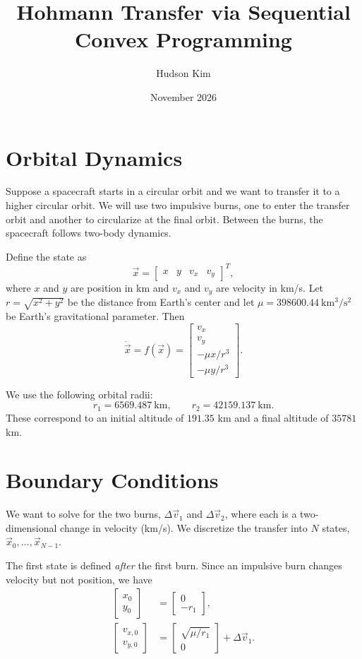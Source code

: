 \documentclass{article}
\title{Hohmann Transfer via Sequential Convex Programming}
\author{Hudson Kim}
\date{November 2026}
\begin{document}
\maketitle

\section{Orbital Dynamics}

Suppose a spacecraft starts in a circular orbit and we want to transfer it to a higher circular orbit. We will use two impulsive burns, one to enter the transfer orbit and another to circularize at the final orbit. Between the burns, the spacecraft follows two-body dynamics.

Define the state as
\[
\vec{x}=\begin{bmatrix}x&y&v_x&v_y\end{bmatrix}^{T},
\]
where $x$ and $y$ are position in km and $v_x$ and $v_y$ are velocity in km/s. Let $r=\sqrt{x^2+y^2}$ be the distance from Earth's center and let $\mu=398600.44\ \mathrm{km^3/s^2}$ be Earth's gravitational parameter. Then
\[
\boxed{
\dot{\vec{x}}=f(\vec{x})=
\begin{bmatrix}
 v_x\\
 v_y\\
 -\mu x/r^3\\
 -\mu y/r^3
\end{bmatrix}.}
\]

We use the following orbital radii:
\[
r_1=6569.487\ \mathrm{km},\qquad r_2=42159.137\ \mathrm{km}.
\]
These correspond to an initial altitude of $191.35$ km and a final altitude of $35781$ km.

\section{Boundary Conditions}

We want to solve for the two burns, $\Delta\vec{v}_1$ and $\Delta\vec{v}_2$, where each is a two-dimensional change in velocity (km/s). We discretize the transfer into $N$ states, $\vec{x}_0,\ldots,\vec{x}_{N-1}$.

The first state is defined \emph{after} the first burn. Since an impulsive burn changes velocity but not position, we have
\begin{align*}
\begin{bmatrix}x_0\\y_0\end{bmatrix}
&=\begin{bmatrix}0\\-r_1\end{bmatrix},\\
\begin{bmatrix}v_{x,0}\\v_{y,0}\end{bmatrix}
&=\begin{bmatrix}\sqrt{\mu/r_1}\\0\end{bmatrix}+\Delta\vec{v}_1.
\end{align*}
\end{document}
